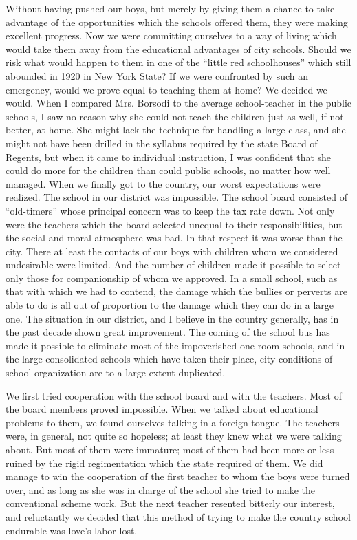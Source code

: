 \documentclass{book}
\begin{document}
Without having pushed our boys, but merely by giving them a chance to take advantage of the opportunities which the schools offered them, they were making excellent progress. Now we were committing ourselves to a way of living which would take them away from the educational advantages of city schools. Should we risk what would happen to them in one of the “little red schoolhouses” which still abounded in 1920 in New York State? If we were confronted by such an emergency, would we prove equal to teaching them at home? We decided we would. When I compared Mrs. Borsodi to the average school-teacher in the public schools, I saw no reason why she could not teach the children just as well, if not better, at home. She might lack the technique for handling a large class, and she might not have been drilled in the syllabus required by the state Board of Regents, but when it came to individual instruction, I was confident that she could do more for the children than could public schools, no matter how well managed. When we finally got to the country, our worst expectations were realized. The school in our district was impossible. The school board consisted of “old-timers” whose principal concern was to keep the tax rate down. Not only were the teachers which the board selected unequal to their responsibilities, but the social and moral atmosphere was bad. In that respect it was worse than the city. There at least the contacts of our boys with children whom we considered undesirable were limited. And the number of children made it possible to select only those for companionship of whom we approved. In a small school, such as that with which we had to contend, the damage which the bullies or perverts are able to do is all out of proportion to the damage which they can do in a large one. The situation in our district, and I believe in the country generally, has in the past decade shown great improvement. The coming of the school bus has made it possible to eliminate most of the impoverished one-room schools, and in the large consolidated schools which have taken their place, city conditions of school organization are to a large extent duplicated.

We first tried cooperation with the school board and with the teachers. Most of the board members proved impossible. When we talked about educational problems to them, we found ourselves talking in a foreign tongue. The teachers were, in general, not quite so hopeless; at least they knew what we were talking about. But most of them were immature; most of them had been more or less ruined by the rigid regimentation which the state required of them. We did manage to win the cooperation of the first teacher to whom the boys were turned over, and as long as she was in charge of the school she tried to make the conventional scheme work. But the next teacher resented bitterly our interest, and reluctantly we decided that this method of trying to make the country school endurable was love’s labor lost.
\end{document}
